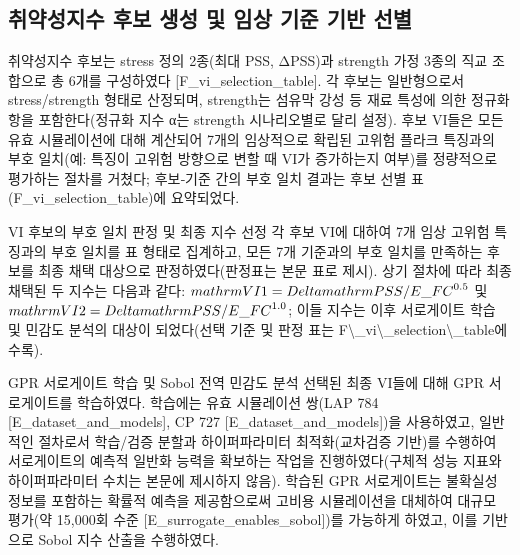 \documentclass[preprint,12pt]{elsarticle}
\begin{document}
\subsection{취약성지수 후보 생성 및 임상 기준 기반 선별}
취약성지수 후보는 stress 정의 2종(최대 PSS, ΔPSS)과 strength 가정 3종의 직교 조합으로 총 6개를 구성하였다 [F\_vi\_selection\_table]. 각 후보는 일반형으로서 stress/strength 형태로 산정되며, strength는 섬유막 강성 등 재료 특성에 의한 정규화 항을 포함한다(정규화 지수 α는 strength 시나리오별로 달리 설정). 후보 VI들은 모든 유효 시뮬레이션에 대해 계산되어 7개의 임상적으로 확립된 고위험 플라크 특징과의 부호 일치(예: 특징이 고위험 방향으로 변할 때 VI가 증가하는지 여부)를 정량적으로 평가하는 절차를 거쳤다; 후보‑기준 간의 부호 일치 결과는 후보 선별 표(F\_vi\_selection\_table)에 요약되었다. 

VI 후보의 부호 일치 판정 및 최종 지수 선정
각 후보 VI에 대하여 7개 임상 고위험 특징과의 부호 일치를 표 형태로 집계하고, 모든 7개 기준과의 부호 일치를 만족하는 후보를 최종 채택 대상으로 판정하였다(판정표는 본문 표로 제시). 상기 절차에 따라 최종 채택된 두 지수는 다음과 같다: $\\mathrm{VI1}=\\Delta\\mathrm{PSS}/E\_{FC}^{0.5}$ 및 $\\mathrm{VI2}=\\Delta\\mathrm{PSS}/E\_{FC}^{1.0}$; 이들 지수는 이후 서로게이트 학습 및 민감도 분석의 대상이 되었다(선택 기준 및 판정 표는 F\textbackslash \_vi\textbackslash \_selection\textbackslash \_table에 수록). 

GPR 서로게이트 학습 및 Sobol 전역 민감도 분석
선택된 최종 VI들에 대해 GPR 서로게이트를 학습하였다. 학습에는 유효 시뮬레이션 쌍(LAP 784 [E\_dataset\_and\_models], CP 727 [E\_dataset\_and\_models])을 사용하였고, 일반적인 절차로서 학습/검증 분할과 하이퍼파라미터 최적화(교차검증 기반)를 수행하여 서로게이트의 예측적 일반화 능력을 확보하는 작업을 진행하였다(구체적 성능 지표와 하이퍼파라미터 수치는 본문에 제시하지 않음). 학습된 GPR 서로게이트는 불확실성 정보를 포함하는 확률적 예측을 제공함으로써 고비용 시뮬레이션을 대체하여 대규모 평가(약 15,000회 수준 [E\_surrogate\_enables\_sobol])를 가능하게 하였고, 이를 기반으로 Sobol 지수 산출을 수행하였다. 
\end{document}
